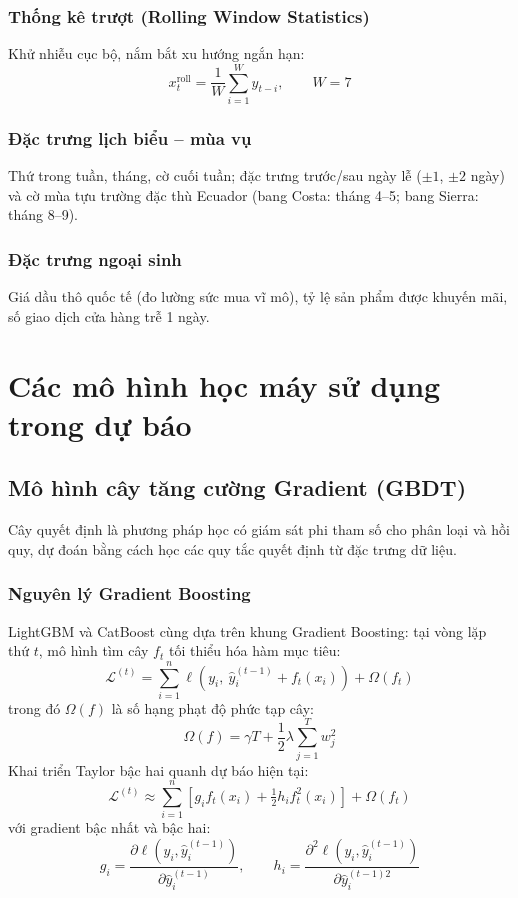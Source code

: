 \documentclass[12pt,a4paper]{report}
\begin{document}
\subsubsection{Thống kê trượt (Rolling Window Statistics)}
Khử nhiễu cục bộ, nắm bắt xu hướng ngắn hạn:
\[
    x^{\mathrm{roll}}_t = \frac{1}{W}\sum_{i=1}^{W} y_{t-i}, \qquad W = 7
\]

\subsubsection{Đặc trưng lịch biểu -- mùa vụ}
Thứ trong tuần, tháng, cờ cuối tuần; đặc trưng trước/sau ngày lễ ($\pm 1$, $\pm 2$ ngày) và cờ mùa tựu trường đặc thù Ecuador (bang Costa: tháng 4--5; bang Sierra: tháng 8--9).

\subsubsection{Đặc trưng ngoại sinh}
Giá dầu thô quốc tế (đo lường sức mua vĩ mô), tỷ lệ sản phẩm được khuyến mãi, số giao dịch cửa hàng trễ 1 ngày.

\section{Các mô hình học máy sử dụng trong dự báo}

\subsection{Mô hình cây tăng cường Gradient (GBDT)}
Cây quyết định là phương pháp học có giám sát phi tham số cho phân loại và hồi quy, dự đoán bằng cách học các quy tắc quyết định từ đặc trưng dữ liệu.

\subsubsection{Nguyên lý Gradient Boosting}
LightGBM và CatBoost cùng dựa trên khung Gradient Boosting: tại vòng lặp thứ $t$, mô hình tìm cây $f_t$ tối thiểu hóa hàm mục tiêu:
\[
    \mathcal{L}^{(t)} = \sum_{i=1}^{n} \ell\!\left(y_i,\ \hat{y}_i^{(t-1)} + f_t(x_i)\right) + \Omega(f_t)
\]
trong đó $\Omega(f)$ là số hạng phạt độ phức tạp cây:
\[
    \Omega(f) = \gamma T + \frac{1}{2}\lambda\sum_{j=1}^{T} w_j^2
\]
Khai triển Taylor bậc hai quanh dự báo hiện tại:
\[
    \mathcal{L}^{(t)} \approx \sum_{i=1}^{n}\left[g_i f_t(x_i) + \tfrac{1}{2} h_i f_t^2(x_i)\right] + \Omega(f_t)
\]
với gradient bậc nhất và bậc hai:
\[
    g_i = \frac{\partial \ell(y_i, \hat{y}_i^{(t-1)})}{\partial \hat{y}_i^{(t-1)}}, \qquad 
    h_i = \frac{\partial^2 \ell(y_i, \hat{y}_i^{(t-1)})}{\partial \hat{y}_i^{(t-1)2}}
\]
\end{document}
